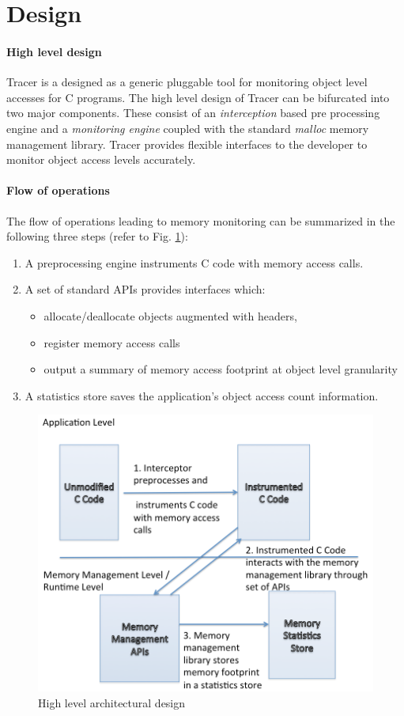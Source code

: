 \section{Design}
\label{sec:design}
\paragraph{High level design}
Tracer is a designed as a generic pluggable tool for monitoring object level accesses for C programs. The high level design of Tracer can be bifurcated into two major components. These consist of an {\emph{interception}} based pre processing engine and a {\emph{monitoring engine}} coupled with the standard {\emph{malloc}} memory management library. Tracer provides flexible interfaces to the developer to monitor object access levels accurately. 

\paragraph{Flow of operations}
The flow of operations leading to memory monitoring can be summarized in the following three steps (refer to Fig. \ref{fig:architecture}):
\begin{enumerate}
\item A preprocessing engine instruments C code with memory access calls.
\item A set of standard APIs provides interfaces which:
\begin{itemize}
\item allocate/deallocate objects augmented with headers, 
\item register memory access calls
\item output a summary of memory access footprint at object level granularity
\end{itemize}
\item A statistics store saves the application's object access count information.
\end{enumerate}

\begin{figure}[!ht]
\caption{High level architectural design}
\label{fig:architecture}
\includegraphics[scale=0.3]{./images/architecture.png}
\end{figure}

